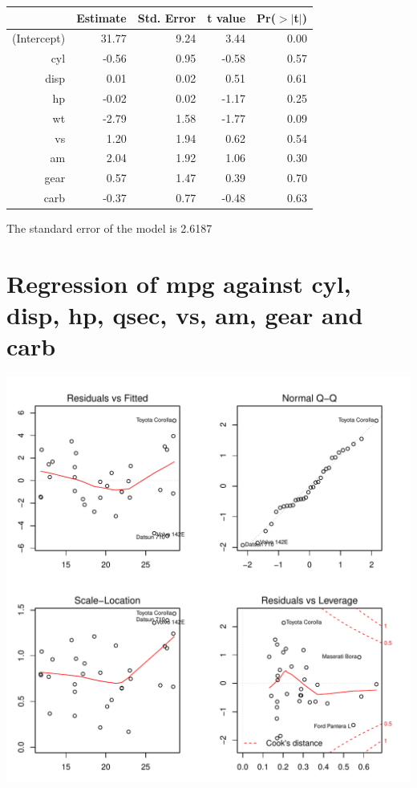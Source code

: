 \documentclass{article}\usepackage[]{graphicx}\usepackage[]{color}
\makeatletter
\def\maxwidth{ %
  \ifdim\Gin@nat@width>\linewidth
    \linewidth
  \else
    \Gin@nat@width
  \fi
}
\newenvironment{knitrout}{}{} %
\makeatother
\begin{document}
\begin{table}[ht]
\centering
\begin{tabular}{rrrrr}
  \hline
 & Estimate & Std. Error & t value & Pr($>$$|$t$|$) \\ 
  \hline
(Intercept) & 31.77 & 9.24 & 3.44 & 0.00 \\ 
  cyl & -0.56 & 0.95 & -0.58 & 0.57 \\ 
  disp & 0.01 & 0.02 & 0.51 & 0.61 \\ 
  hp & -0.02 & 0.02 & -1.17 & 0.25 \\ 
  wt & -2.79 & 1.58 & -1.77 & 0.09 \\ 
  vs & 1.20 & 1.94 & 0.62 & 0.54 \\ 
  am & 2.04 & 1.92 & 1.06 & 0.30 \\ 
  gear & 0.57 & 1.47 & 0.39 & 0.70 \\ 
  carb & -0.37 & 0.77 & -0.48 & 0.63 \\ 
   \hline
\end{tabular}
\end{table}




The standard error of the model is 2.6187

\newpage

\section{Regression of mpg against cyl, disp, hp, qsec, vs, am, gear and carb }
\begin{knitrout}
\color{fgcolor}

{\centering \includegraphics[width=\maxwidth]{figure/lm-cyl-disp-hp-qsec-vs-am-gear-carb} 

}



\end{knitrout}
\end{document}
